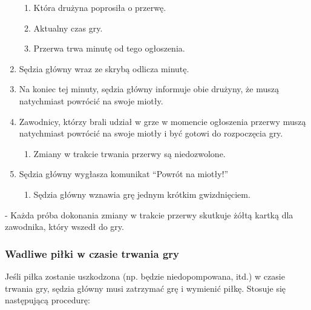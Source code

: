 \documentclass[12pt]{article}
\newcommand\yellowcard{\bgroup\color{yellow}\markoverwith{\textcolor{yellow}{\rule[-0.5ex]{2pt}{0.4pt}}}\ULon}
\begin{document}
\begin{enumerate}
	      \begin{enumerate}
		      \item
		            Która drużyna poprosiła o przerwę.
		      \item
		            Aktualny czas gry.
		      \item
		            Przerwa trwa minutę od tego ogłoszenia.
	      \end{enumerate}
	\item
	      Sędzia główny wraz ze skrybą odlicza minutę.
	\item
	      Na koniec tej minuty, sędzia główny informuje obie drużyny, że muszą
	      natychmiast powrócić na swoje miotły.
	\item
	      Zawodnicy, którzy brali udział w grze w momencie ogłoszenia przerwy
	      muszą natychmiast powrócić na swoje miotły i być gotowi do rozpoczęcia
	      gry.

	      \begin{enumerate}
		      \item
		            Zmiany w trakcie trwania przerwy są niedozwolone.
	      \end{enumerate}
	\item
	      Sędzia główny wygłasza komunikat ``Powrót na miotły!''

	      \begin{enumerate}
		      \item
		            Sędzia główny wznawia grę jednym krótkim gwizdnięciem.
	      \end{enumerate}
\end{enumerate}

\yellowcard{Żółta kartka} - Każda próba dokonania zmiany w trakcie przerwy
skutkuje żółtą kartką dla zawodnika, który wszedł do gry.

\subsubsection{Wadliwe piłki w czasie trwania gry}

Jeśli piłka zostanie uszkodzona (np. będzie niedopompowana, itd.) w
czasie trwania gry, sędzia główny musi zatrzymać grę i wymienić piłkę.
Stosuje się następującą procedurę:
\end{document}

